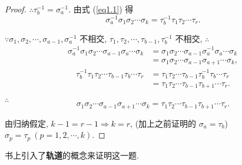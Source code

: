 \documentclass{ctexart}
\begin{document}
\begin{proof}
    $\therefore\tau_b^{-1}=\sigma_a^{-1}$. 由式 (\ref{eq1.1}) 得
    \[\sigma_a^{-1}\sigma_1\sigma_2\cdots\sigma_k=\tau_b^{-1}\tau_1\tau_2\cdots\tau_r.\]

    $\because\sigma_1,\sigma_2,\cdots,\sigma_{a-1},\sigma_a^{-1}$ 不相交, $\tau_1,\tau_2,\cdots,\tau_{b-1},\tau_b^{-1}$ 不相交, $\therefore$
    \begin{align*}
        \sigma_a^{-1}\sigma_1\sigma_2\cdots\sigma_{a-1}\sigma_a\cdots\sigma_k & =\sigma_1\sigma_2\cdots\sigma_{a-1}\sigma_a^{-1}\sigma_a\cdots\sigma_k \\
        & =\sigma_1\sigma_2\cdots\sigma_{a-1}\sigma_{a+1}\cdots\sigma_k,
    \end{align*}
    \begin{align*}
        \tau_b^{-1}\tau_1\tau_2\cdots\tau_{b-1}\tau_b\cdots\tau_r & =\tau_1\tau_2\cdots\tau_{b-1}\tau_b^{-1}\tau_b\cdots\tau_r \\
        & =\tau_1\tau_2\cdots\tau_{b-1}\tau_{b+1}\cdots\tau_r.
    \end{align*}

    $\therefore$
    \[\sigma_1\sigma_2\cdots\sigma_{a-1}\sigma_{a+1}\cdots\sigma_k=\tau_1\tau_2\cdots\tau_{b-1}\tau_{b+1}\cdots\tau_r.\]

    由归纳假定, $k-1=r-1\Rightarrow k=r$, (加上之前证明的 $\sigma_a=\tau_b$) $\sigma_p=\tau_p\ (p=1,2,\cdots,k)$.
\end{proof}

书上引入了\textbf{轨道}的概念来证明这一题.
\end{document}
